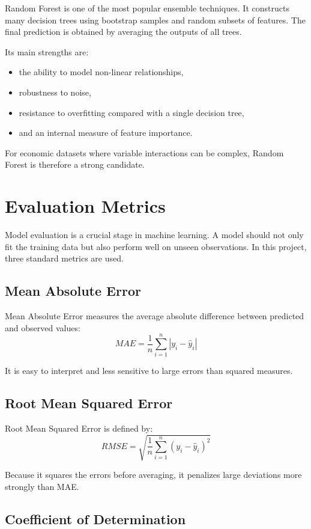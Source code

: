 Random Forest is one of the most popular ensemble techniques.
It constructs many decision trees using bootstrap samples and random subsets of features.
The final prediction is obtained by averaging the outputs of all trees.

Its main strengths are:
\begin{itemize}
\item the ability to model non-linear relationships,
\item robustness to noise,
\item resistance to overfitting compared with a single decision tree,
\item and an internal measure of feature importance.
\end{itemize}

For economic datasets where variable interactions can be complex, Random Forest is therefore a strong candidate.

\section{Evaluation Metrics}

Model evaluation is a crucial stage in machine learning.
A model should not only fit the training data but also perform well on unseen observations.
In this project, three standard metrics are used.

\subsection{Mean Absolute Error}

Mean Absolute Error measures the average absolute difference between predicted and observed values:
\[
MAE = \frac{1}{n}\sum_{i=1}^{n} |y_i - \hat{y}_i|
\]

It is easy to interpret and less sensitive to large errors than squared measures.

\subsection{Root Mean Squared Error}

Root Mean Squared Error is defined by:
\[
RMSE = \sqrt{\frac{1}{n}\sum_{i=1}^{n}(y_i - \hat{y}_i)^2}
\]

Because it squares the errors before averaging, it penalizes large deviations more strongly than MAE.

\subsection{Coefficient of Determination}

